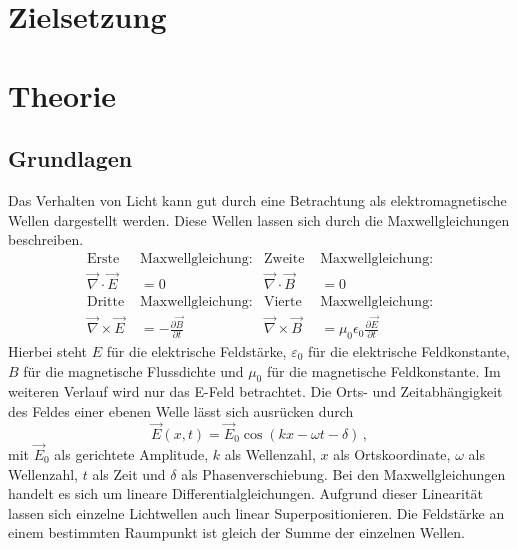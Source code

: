 \section{Zielsetzung}
\label{sec:Zielsetzung}

\section{Theorie}
\label{sec:Theorie}

\subsection{Grundlagen}
\label{sec:Grundlagen}



Das Verhalten von Licht kann gut durch eine Betrachtung als elektromagnetische Wellen
dargestellt werden. Diese Wellen lassen sich durch die Maxwellgleichungen beschreiben.
\begin{align*}
    \text{Erste } & \text{Maxwellgleichung:} & \text{Zweite } & \text{Maxwellgleichung:} \\
    \vec{\nabla} \cdot \vec{E} &= 0 & \vec{\nabla} \cdot \vec{B} &= 0 \\
    \text{Dritte } & \text{Maxwellgleichung:} & \text{Vierte } & \text{Maxwellgleichung:} \\
    \vec{\nabla} \times \vec{E} &= - \frac{\partial \vec{B}}{\partial t}   &  \vec{\nabla} \times \vec{B} &= \mu_0 \epsilon_0 \frac{\partial \vec{E}}{\partial t}
\end{align*}
Hierbei steht $E$ für die elektrische Feldstärke, $ε_0$ für die elektrische Feldkonstante,
$B$ für die magnetische Flussdichte und $μ_0$ für die magnetische Feldkonstante.
Im weiteren Verlauf wird nur das E-Feld betrachtet.
Die Orts- und Zeitabhängigkeit des Feldes einer ebenen Welle lässt sich ausrücken durch
\begin{equation}\label{eq:ebeneWelle}
    \vec{E}\left(x,t\right) = \vec{E}_0 \cos\left( k x - ω t - δ\right)\, ,
\end{equation}
mit $\vec{E}_0$ als gerichtete Amplitude, $k$ als Wellenzahl, $x$ als Ortskoordinate, $ω$ als Wellenzahl, $t$ als Zeit und $δ$ als Phasenverschiebung.
Bei den Maxwellgleichungen handelt es sich um lineare Differentialgleichungen.
Aufgrund dieser Linearität lassen sich einzelne Lichtwellen auch linear Superpositionieren.
Die Feldstärke an einem bestimmten Raumpunkt ist gleich der Summe der einzelnen Wellen.
